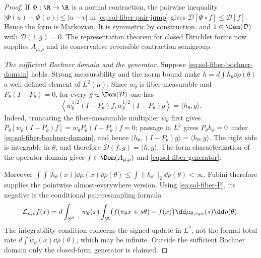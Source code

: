 \documentclass[../main.tex]{subfiles}
\begin{document}
\begin{proof}
If $\Phi:\R\to\R$ is a normal contraction, the pairwise inequality
$|\Phi(u)-\Phi(v)|\le|u-v|$ in \eqref{eq:sol-fiber-pair-jump} gives
$\mathcal D[\Phi\circ f]\le\mathcal D[f]$.  Hence the form is Markovian.  It is symmetric by
construction, and $1\in\Dom(\mathcal D)$ with $\mathcal D(1,g)=0$.  The representation theorem
for closed Dirichlet forms now supplies $A_{\mu,\rho}$ and its conservative reversible
contraction semigroup.

\emph{The sufficient Bochner domain and the generator.}
Suppose \eqref{eq:sol-fiber-bochner-domain} holds.  Strong measurability and the norm bound make
$h=d\int h_\theta\dd\rho(\theta)$ a well-defined element of $L^2(\mu)$.  Since
$w_\theta$ is fiber-measurable and $P_\theta(I-P_\theta)=0$, for every
$g\in\Dom(\mathcal D)$ one has
\begin{equation}
 \left\langle w_\theta^{1/2}(I-P_\theta)f,
 w_\theta^{1/2}(I-P_\theta)g\right\rangle
 =\langle h_\theta,g\rangle.
 \label{eq:sol-fiber-generator-pairing}
\end{equation}
Indeed, truncating the fiber-measurable multiplier $w_\theta$ first gives
$P_\theta[w_\theta(I-P_\theta)f]=w_\theta P_\theta(I-P_\theta)f=0$; passage in $L^2$ gives
$P_\theta h_\theta=0$ under \eqref{eq:sol-fiber-bochner-domain}, and hence
$\langle h_\theta,(I-P_\theta)g\rangle=\langle h_\theta,g\rangle$.
The right side is integrable in $\theta$, and therefore
$\mathcal D(f,g)=\langle h,g\rangle$.  The form characterization of the operator domain gives
$f\in\Dom(A_{\mu,\rho})$ and \eqref{eq:sol-fiber-generator}.

Moreover
$\int\!\int|h_\theta(x)|\dd\mu(x)\dd\rho(\theta)
\le\int\|h_\theta\|_2\dd\rho(\theta)<\infty$.
Fubini therefore supplies the pointwise almost-everywhere version.  Using
\eqref{eq:sol-fiber-P}, its negative is the conditional pair-resampling formula
\begin{equation}
 \mathcal L_{\mu,\rho}f(x)
 =d\int_{S^{d-1}}w_\theta(x)
 \int_\R\bigl(f(\pi_\theta x+s\theta)-f(x)\bigr)
 \dd\mu_{\theta,\pi_\theta x}(s)\dd\rho(\theta).
 \label{eq:sol-fiber-pointwise-generator}
\end{equation}
The integrability condition concerns the signed update in $L^2$, not the formal total rate
$d\int w_\theta(x)\dd\rho(\theta)$, which may be infinite.  Outside the sufficient Bochner
domain only the closed-form generator is claimed.


\end{proof}
\end{document}
